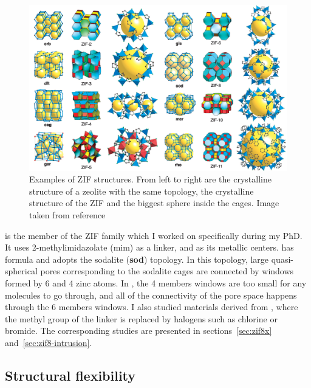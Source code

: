 \documentclass[thesis]{subfiles}
\begin{document}
\begin{figure}[b]
    \centering
    \includegraphics[width=\textwidth]{figures/cited/zif-examples}
    \caption{Examples of ZIF structures. From left to right are the crystalline
    structure of a zeolite with the same topology, the crystalline structure of
    the ZIF and the biggest sphere inside the cages. Image taken from
    reference~\cite{Park2006}}
    \label{fig:zif-examples}
\end{figure}

 is the member of the ZIF family which I worked on specifically during my
PhD. It uses 2-methylimidazolate (mim) as a linker, and  as its
metallic centers.  has formula  and adopts the sodalite
(\textbf{sod}) topology. In this topology, large quasi-spherical pores
corresponding to the sodalite cages are connected by windows formed by 6 and 4
zinc atoms. In , the 4 members windows are too small for any molecules to
go through, and all of the connectivity of the pore space happens through the 6
members windows. I also studied materials derived from , where the methyl
group of the linker is replaced by halogens such as chlorine or bromide. The
corresponding studies are presented in sections~\ref{sec:zif8x}
and~\ref{sec:zif8-intrusion}.

\newpage
\subsection{Structural flexibility}
\end{document}
